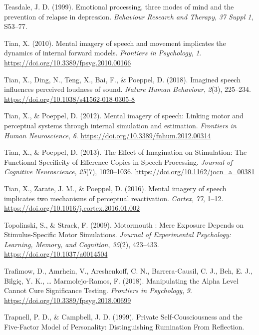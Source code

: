 \documentclass[a4paper,12pt,twoside,openright,oldfontcommands]{memoir}
\begin{document}
\leavevmode\hypertarget{ref-teasdale_emotional_1999}{}%
Teasdale, J. D. (1999). Emotional processing, three modes of mind and the prevention of relapse in depression. \emph{Behaviour Research and Therapy}, \emph{37 Suppl 1}, S53--77.

\leavevmode\hypertarget{ref-tian_mental_2010}{}%
Tian, X. (2010). Mental imagery of speech and movement implicates the dynamics of internal forward models. \emph{Frontiers in Psychology}, \emph{1}. \url{https://doi.org/10.3389/fpsyg.2010.00166}

\leavevmode\hypertarget{ref-tian_imagined_2018}{}%
Tian, X., Ding, N., Teng, X., Bai, F., \& Poeppel, D. (2018). Imagined speech influences perceived loudness of sound. \emph{Nature Human Behaviour}, \emph{2}(3), 225--234. \url{https://doi.org/10.1038/s41562-018-0305-8}

\leavevmode\hypertarget{ref-tian_mental_2012}{}%
Tian, X., \& Poeppel, D. (2012). Mental imagery of speech: Linking motor and perceptual systems through internal simulation and estimation. \emph{Frontiers in Human Neuroscience}, \emph{6}. \url{https://doi.org/10.3389/fnhum.2012.00314}

\leavevmode\hypertarget{ref-tian_effect_2013}{}%
Tian, X., \& Poeppel, D. (2013). The Effect of Imagination on Stimulation: The Functional Specificity of Efference Copies in Speech Processing. \emph{Journal of Cognitive Neuroscience}, \emph{25}(7), 1020--1036. \url{https://doi.org/10.1162/jocn_a_00381}

\leavevmode\hypertarget{ref-tian_mental_2016}{}%
Tian, X., Zarate, J. M., \& Poeppel, D. (2016). Mental imagery of speech implicates two mechanisms of perceptual reactivation. \emph{Cortex}, \emph{77}, 1--12. \url{https://doi.org/10.1016/j.cortex.2016.01.002}

\leavevmode\hypertarget{ref-topolinski_motormouth_2009}{}%
Topolinski, S., \& Strack, F. (2009). Motormouth : Mere Exposure Depends on Stimulus-Specific Motor Simulations. \emph{Journal of Experimental Psychology: Learning, Memory, and Cognition}, \emph{35}(2), 423--433. \url{https://doi.org/10.1037/a0014504}

\leavevmode\hypertarget{ref-trafimow_manipulating_2018}{}%
Trafimow, D., Amrhein, V., Areshenkoff, C. N., Barrera-Causil, C. J., Beh, E. J., Bilgiç, Y. K., \ldots{} Marmolejo-Ramos, F. (2018). Manipulating the Alpha Level Cannot Cure Significance Testing. \emph{Frontiers in Psychology}, \emph{9}. \url{https://doi.org/10.3389/fpsyg.2018.00699}

\leavevmode\hypertarget{ref-trapnell_private_1999}{}%
Trapnell, P. D., \& Campbell, J. D. (1999). Private Self-Cousciousness and the Five-Factor Model of Personality: Distinguishing Rumination From Reflection.
\end{document}
